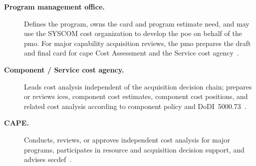 \documentclass[../main.tex]{subfiles}
\begin{document}
\begin{description}
  \item[\textbf{Program management office.}] Defines the program, owns the \ac{card} and program estimate need, and may use the SYSCOM cost organization to develop the \ac{poe} on behalf of the \ac{pmo}. For major capability acquisition reviews, the \ac{pmo} prepares the draft and final \ac{card} for \ac{cape} Cost Assessment and the Service cost agency~\autocite{edo-3-1-6-cost-estimating-2024,DoDI5000-73-Cost-Analysis-2024}.
  \item[\textbf{Component / Service cost agency.}] Leads cost analysis independent of the acquisition decision chain; prepares or reviews \acp{ice}, component cost estimates, component cost positions, and related cost analysis according to component policy and DoDI~5000.73~\autocite{edo-3-1-6-cost-estimating-2024,DoDI5000-73-Cost-Analysis-2024}.
  \item[\textbf{CAPE.}] Conducts, reviews, or approves independent cost analysis for major programs, participates in resource and acquisition decision support, and advises \ac{secdef}~\autocite{edo-3-1-6-cost-estimating-2024,USC-139a-CAPE,DoDI5000-73-Cost-Analysis-2024}.
\end{description}
\end{document}
